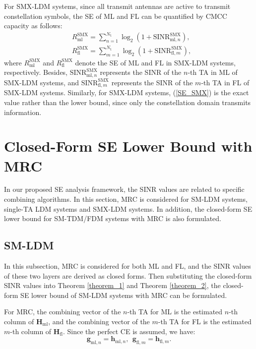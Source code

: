 \documentclass[journal]{IEEEtran}
\begin{document}
For SMX-LDM systems, since all transmit antennas are active to transmit constellation symbols, the SE of ML and FL can be quantified by CMCC capacity as follows:
\begin{equation}
\begin{split}
&R_\text{ml}^\text{SMX} = \sum_{n=1}^{N_\text{t}} \log_2\left(1+\text{SINR}_{\text{ml},n}^\text{SMX}\right), \\
&R_\text{fl}^\text{SMX} = \sum_{m=1}^{N_\text{t}} \log_2\left(1+\text{SINR}_{\text{fl},m}^\text{SMX}\right),
\end{split}
\label{SE_SMX}
\end{equation}
where $R_\text{ml}^\text{SMX}$ and $R_\text{fl}^\text{SMX}$ denote the SE of ML and FL in SMX-LDM systems, respectively. Besides, $\text{SINR}_{\text{ml},n}^\text{SMX}$ represents the SINR of the $n$-th TA in ML of SMX-LDM systems, and $\text{SINR}_{\text{fl},m}^\text{SMX}$ represents the SINR of the $m$-th TA in FL of SMX-LDM systems. Similarly, for SMX-LDM systems, (\ref{SE_SMX}) is the exact value rather than the lower bound, since only the constellation domain transmits information.

\section{Closed-Form SE Lower Bound with MRC}

In our proposed SE analysis framework, the SINR values are related to specific combining algorithms. In this section, MRC is considered for SM-LDM systems, single-TA LDM systems and SMX-LDM systems. In addition, the closed-form SE lower bound for SM-TDM/FDM systems with MRC is also formulated.

\subsection{SM-LDM}
In this subsection, MRC is considered for both ML and FL, and the SINR values of these two layers are derived as closed forms. Then substituting the closed-form SINR values into Theorem \ref{theorem_1} and Theorem \ref{theorem_2}, the closed-form SE lower bound of SM-LDM systems with MRC can be formulated.

For MRC, the combining vector of the $n$-th TA for ML is the estimated $n$-th column of $\mathbf{H}_\text{ml}$, and the combining vector of the $m$-th TA for FL is the estimated $m$-th column of $\mathbf{H}_\text{fl}$. Since the perfect CE is assumed, we have:
\begin{equation}
\mathbf{g}_{\text{ml},n} = \mathbf{h}_{\text{ml},n}, \ \ \mathbf{g}_{\text{fl},m} = \mathbf{h}_{\text{fl},m}.
\label{MRC_g}
\end{equation}
\end{document}
